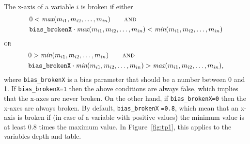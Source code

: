 \documentclass[11pt, fleqn, a4paper]{article}\usepackage{graphicx, color}
\begin{document}
The x-axis of a variable $i$ is broken if
either
\begin{align*}
& 0 < \textit{max}(m_{i1}, m_{i2},\ldots, m_{in}) \qquad \textsc{and}\\
& \mbox{{\tt bias\_brokenX}} \cdot \textit{max}(m_{i1}, m_{i2},\ldots, m_{in}) < \textit{min}(m_{i1}, m_{i2},\ldots, m_{in}) 
\end{align*}
\textsc{or}
\begin{align*}
& 0 > \textit{min}(m_{i1}, m_{i2},\ldots, m_{in}) \qquad \textsc{and}\\
& \mbox{{\tt bias\_brokenX}} \cdot \textit{min}(m_{i1}, m_{i2},\ldots, m_{in}) > \textit{max}(m_{i1}, m_{i2},\ldots, m_{in}),
\end{align*}
where {\tt bias\_brokenX} is a bias parameter that should be a number between 0 and 1. If {\tt bias\_brokenX=1} then the above conditions are always false, which implies that the x-axes are never broken. On the other hand, if {\tt bias\_brokenX=0} then the x-axes are always broken. By default, {\tt bias\_brokenX} {\tt=0.8}, which mean that an x-axis is broken if (in case of a variable with positive values) the minimum value is at least 0.8 times the maximum value. In Figure~\ref{fig:tp1}, this applies to the variables depth and table.
\end{document}
